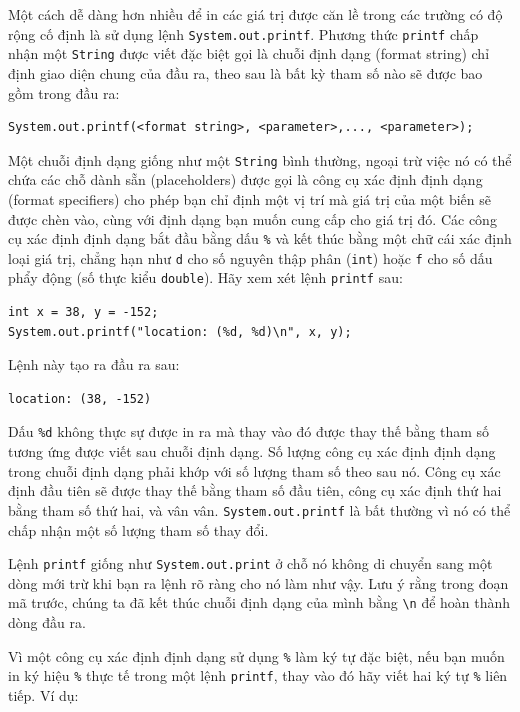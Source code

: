 Một cách dễ dàng hơn nhiều để in các giá trị được căn lề trong các
trường có độ rộng cố định là sử dụng lệnh \texttt{System.out.printf}.
Phương thức \texttt{printf} chấp nhận một \texttt{String} được viết đặc
biệt gọi là chuỗi định dạng (format string) chỉ định giao diện chung của
đầu ra, theo sau là bất kỳ tham số nào sẽ được bao gồm trong đầu ra:

\begin{verbatim}
System.out.printf(<format string>, <parameter>,..., <parameter>);
\end{verbatim}

Một chuỗi định dạng giống như một \texttt{String} bình thường, ngoại trừ
việc nó có thể chứa các chỗ dành sẵn (placeholders) được gọi là công cụ
xác định định dạng (format specifiers) cho phép bạn chỉ định một vị trí
mà giá trị của một biến sẽ được chèn vào, cùng với định dạng bạn muốn
cung cấp cho giá trị đó. Các công cụ xác định định dạng bắt đầu bằng dấu
\texttt{\%} và kết thúc bằng một chữ cái xác định loại giá trị, chẳng
hạn như \texttt{d} cho số nguyên thập phân (\texttt{int}) hoặc
\texttt{f} cho số dấu phẩy động (số thực kiểu \texttt{double}). Hãy xem
xét lệnh \texttt{printf} sau:

\begin{verbatim}
int x = 38, y = -152;
System.out.printf("location: (%d, %d)\n", x, y);
\end{verbatim}

Lệnh này tạo ra đầu ra sau:

\begin{verbatim}
location: (38, -152)
\end{verbatim}

Dấu \texttt{\%d} không thực sự được in ra mà thay vào đó được thay thế
bằng tham số tương ứng được viết sau chuỗi định dạng. Số lượng công cụ
xác định định dạng trong chuỗi định dạng phải khớp với số lượng tham số
theo sau nó. Công cụ xác định đầu tiên sẽ được thay thế bằng tham số đầu
tiên, công cụ xác định thứ hai bằng tham số thứ hai, và vân vân.
\texttt{System.out.printf} là bất thường vì nó có thể chấp nhận một số
lượng tham số thay đổi.

Lệnh \texttt{printf} giống như \texttt{System.out.print} ở chỗ nó không
di chuyển sang một dòng mới trừ khi bạn ra lệnh rõ ràng cho nó làm như
vậy. Lưu ý rằng trong đoạn mã trước, chúng ta đã kết thúc chuỗi định
dạng của mình bằng \texttt{\textbackslash{}n} để hoàn thành dòng đầu ra.

Vì một công cụ xác định định dạng sử dụng \texttt{\%} làm ký tự đặc
biệt, nếu bạn muốn in ký hiệu \texttt{\%} thực tế trong một lệnh
\texttt{printf}, thay vào đó hãy viết hai ký tự \texttt{\%} liên tiếp.
Ví dụ:

